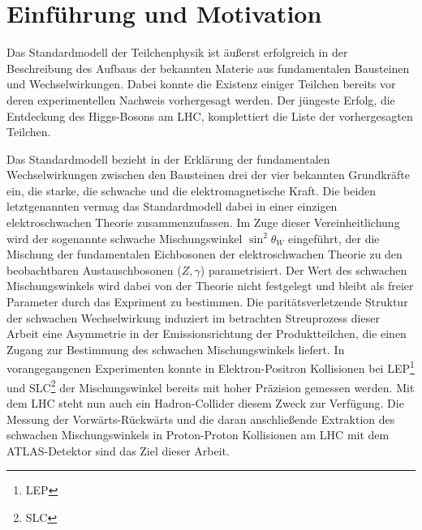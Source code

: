 


\chapter{Einführung und Motivation}


Das Standardmodell der Teilchenphysik ist äußerst erfolgreich in der
Beschreibung des Aufbaus der bekannten Materie aus fundamentalen Bausteinen und
Wechselwirkungen. Dabei konnte die Existenz einiger Teilchen bereits vor deren
experimentellen Nachweis vorhergesagt werden. Der jüngeste Erfolg, die
Entdeckung des Higgs-Bosons am \ac{LHC}, komplettiert die Liste der
vorhergesagten Teilchen.

Das Standardmodell bezieht in der Erklärung der fundamentalen Wechselwirkungen
zwischen den Bausteinen drei der vier bekannten Grundkräfte ein, die starke,
die schwache und die elektromagnetische Kraft. Die beiden letztgenannten vermag
das Standardmodell dabei in einer einzigen elektroschwachen Theorie
zusammenzufassen. Im Zuge dieser Vereinheitlichung wird der sogenannte schwache
Mischungswinkel $\sin^2\theta_W$ eingeführt, der die Mischung der fundamentalen
Eichbosonen der elektroschwachen Theorie zu den beobachtbaren Austauschbosonen
($Z,\gamma$) parametrisiert. Der Wert des schwachen Mischungswinkels wird dabei
von der Theorie nicht festgelegt und bleibt als freier Parameter durch das
Expriment zu bestimmen. Die paritätsverletzende Struktur der schwachen
Wechselwirkung induziert im betrachten Streuprozess dieser Arbeit eine
Asymmetrie in der Emissionsrichtung der Produktteilchen, die einen Zugang zur
Bestimmung des schwachen Mischungswinkels liefert. In vorangegangenen
Experimenten konnte in Elektron-Positron Kollisionen bei
\acs{LEP}\footnote{\acf{LEP}} und \acs{SLC}\footnote{\acf{SLC}} der
Mischungswinkel bereits mit hoher Präzision gemessen werden. Mit dem \ac{LHC}
steht nun auch ein Hadron-Collider diesem Zweck zur Verfügung. Die Messung der
Vorwärts-Rückwärts und die daran anschließende Extraktion des schwachen
Mischungswinkels in Proton-Proton Kollisionen am \ac{LHC} mit dem
ATLAS-Detektor sind das Ziel dieser Arbeit.

